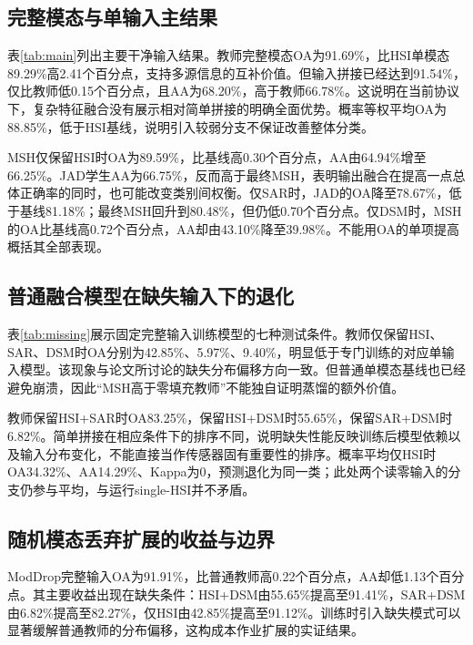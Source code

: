 \documentclass[conference,10pt]{IEEEtran}
\begin{document}
\subsection{完整模态与单输入主结果}
表\ref{tab:main}列出主要干净输入结果。教师完整模态OA为91.69\%，比HSI单模态89.29\%高2.41个百分点，支持多源信息的互补价值。但输入拼接已经达到91.54\%，仅比教师低0.15个百分点，且AA为68.20\%，高于教师66.78\%。这说明在当前协议下，复杂特征融合没有展示相对简单拼接的明确全面优势。概率等权平均OA为88.85\%，低于HSI基线，说明引入较弱分支不保证改善整体分类。

\begin{table}[t]\centering\caption{主要干净输入结果；TEACHER、MODDROP、CONCAT、MEAN使用完整输入，其余使用名称所示单输入}\label{tab:main}\small\end{table}

MSH仅保留HSI时OA为89.59\%，比基线高0.30个百分点，AA由64.94\%增至66.25\%。JAD学生AA为66.75\%，反而高于最终MSH，表明输出融合在提高一点总体正确率的同时，也可能改变类别间权衡。仅SAR时，JAD的OA降至78.67\%，低于基线81.18\%；最终MSH回升到80.48\%，但仍低0.70个百分点。仅DSM时，MSH的OA比基线高0.72个百分点，AA却由43.10\%降至39.98\%。不能用OA的单项提高概括其全部表现。

\subsection{普通融合模型在缺失输入下的退化}
表\ref{tab:missing}展示固定完整输入训练模型的七种测试条件。教师仅保留HSI、SAR、DSM时OA分别为42.85\%、5.97\%、9.40\%，明显低于专门训练的对应单输入模型。该现象与论文所讨论的缺失分布偏移方向一致。但普通单模态基线也已经避免崩溃，因此“MSH高于零填充教师”不能独自证明蒸馏的额外价值。

\begin{table}[t]\centering\caption{不同可用输入下的OA（\%）；缺失输入全零填充}\label{tab:missing}\small\end{table}

教师保留HSI+SAR时OA83.25\%，保留HSI+DSM时55.65\%，保留SAR+DSM时6.82\%。简单拼接在相应条件下的排序不同，说明缺失性能反映训练后模型依赖以及输入分布变化，不能直接当作传感器固有重要性的排序。概率平均仅HSI时OA34.32\%、AA14.29\%、Kappa为0，预测退化为同一类；此处两个读零输入的分支仍参与平均，与运行single-HSI并不矛盾。

\subsection{随机模态丢弃扩展的收益与边界}
ModDrop完整输入OA为91.91\%，比普通教师高0.22个百分点，AA却低1.13个百分点。其主要收益出现在缺失条件：HSI+DSM由55.65\%提高至91.41\%，SAR+DSM由6.82\%提高至82.27\%，仅HSI由42.85\%提高至91.12\%。训练时引入缺失模式可以显著缓解普通教师的分布偏移，这构成本作业扩展的实证结果。
\end{document}
